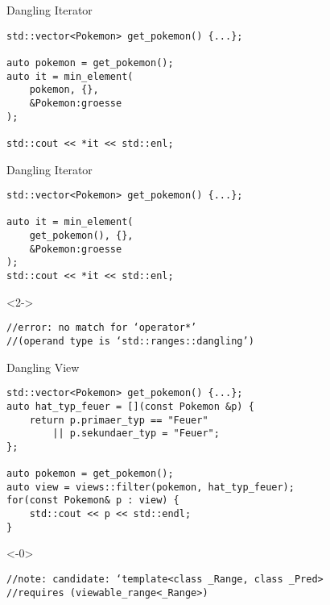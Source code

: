 \begin{frame}[fragile]{Dangling Iterator}
    \begin{overlayarea}{\linewidth}{6cm}
        \begin{verbatim}
std::vector<Pokemon> get_pokemon() {...};

auto pokemon = get_pokemon();
auto it = min_element(
    pokemon, {},
    &Pokemon:groesse
);

std::cout << *it << std::enl;
        \end{verbatim}
    \end{overlayarea}
\end{frame}

\begin{frame}[fragile]{Dangling Iterator}
    \begin{overlayarea}{\linewidth}{6cm}
        \begin{verbatim}
std::vector<Pokemon> get_pokemon() {...};

auto it = min_element(
    get_pokemon(), {},
    &Pokemon:groesse
);
std::cout << *it << std::enl;
    \end{verbatim}
        \begin{onlyenv}<2->
            \begin{verbatim}
//error: no match for ‘operator*’
//(operand type is ‘std::ranges::dangling’)
            \end{verbatim}
        \end{onlyenv}
    \end{overlayarea}
\end{frame}



\begin{frame}[fragile]{Dangling View}
    \begin{overlayarea}{\linewidth}{6cm}
        \begin{verbatim}
std::vector<Pokemon> get_pokemon() {...};
auto hat_typ_feuer = [](const Pokemon &p) { 
    return p.primaer_typ == "Feuer"
        || p.sekundaer_typ = "Feuer";
};

auto pokemon = get_pokemon();
auto view = views::filter(pokemon, hat_typ_feuer);
for(const Pokemon& p : view) {
    std::cout << p << std::endl;
}
    \end{verbatim}
        \begin{onlyenv}<-0>
            \begin{verbatim}
//note: candidate: ‘template<class _Range, class _Pred>
//requires (viewable_range<_Range>)
            \end{verbatim}
        \end{onlyenv}
    \end{overlayarea}
\end{frame}

